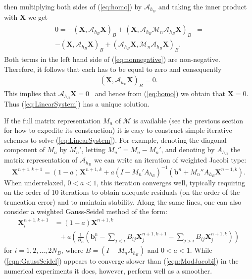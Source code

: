 \documentclass[preprint,12pt]{elsarticle}
\begin{document}
then multiplying both sides of (\ref{eq:homo}) by $\mathcal{A}_{h_B}$ and taking the inner product
with $\mathbf{X}$ we get
\begin{align}
\begin{split}
0=-(\mathbf{X}, \mathcal{A}_{h_B}\mathbf{X})_{B} + (\mathbf{X},\mathcal{A}_{h_B}\mathcal{M}_ n\mathcal{A}_{h_B} \mathbf{X})_{B} &= \\
-(\mathbf{X}, \mathcal{A}_{h_B}\mathbf{X})_{B} + (\mathcal{A}_{h_B}\mathbf{X},\mathcal{M}_n \mathcal{A}_{h_B} \mathbf{X})_{B} .
\end{split}
  \label{eq:nonnegative}
\end{align}
 Both terms in the left hand side of (\ref{eq:nonnegative}) are non-negative. Therefore, it follows that each has to be equal to zero and consequently
\begin{align}
(\mathbf{X},\mathcal{A}_{h_B}\mathbf{X})_{B} =0. 
\end{align}
This implies that $\mathcal{A}_{h_B}\mathbf{X}=0$~\cite{TP92} and hence from (\ref{eq:homo}) we obtain that 
$\mathbf{X}=0$. Thus (\ref{eq:LinearSystem}) has a unique solution.

If the full matrix representation $\mathit{M}_n$ of $\mathcal{M}$ is available (see the previous section for how to expedite its construction) it is easy to construct
simple iterative schemes to solve (\ref{eq:LinearSystem}). For example, denoting the diagonal component of $\mathit{M}_n$ by $\mathit{M}_n'$, letting 
$\mathit{M}_n'' = \mathit{M}_n - \mathit{M}_n'$, and denoting by $A_{h_B}$ the matrix representation of $\mathcal{A}_{h_B}$ we can write an iteration of weighted Jacobi type:
\begin{equation}
\mathbf{X}^{n+1,k+1} = (1-a)\mathbf{X}^{n+1,k} 
+ a(\mathit{I}- \mathit{M}_n'\mathit{A}_{h_B})^{-1}
(\mathbf{b}^n +\mathit{M}_n''\mathit{A}_{h_B}\mathbf{X}^{n+1,k}).
\label{eqn:ModJacobi}
\end{equation}
When underrelaxed, $0<a<1$, this iteration converges well, typically requiring on the order of 10 iterations to obtain
adequate residuals (on the order of the truncation error) and to maintain stability. Along the same lines, one can also consider a weighted Gauss-Seidel method of the form:
\begin{equation}
\begin{split}
\mathbf{X}^{n+1,k+1}_i
&=
(1-a)\mathbf{X}^{n+1,k} \\
&\mbox{ } +  a\left(
\frac{1}{B_{ii}} \left(\mathbf{b}^n_i - \sum_{j<i}B_{ij}\mathbf{X}^{n+1,k+1}_j-\sum_{j>i}B_{ij}\mathbf{X}^{n+1,k}_j\right)
\right)
\end{split}
\label{eqn:GaussSeidel}
\end{equation}
for $ i=1,2,\ldots,2N_B$, 
where $B=(\mathit{I}- M_n A_{h_B})$  and  $0<a<1$. 
While (\ref{eqn:GaussSeidel}) appears to converge slower than (\ref{eqn:ModJacobi}) in the numerical experiments
it does, however, perform well as a smoother.
\end{document}
